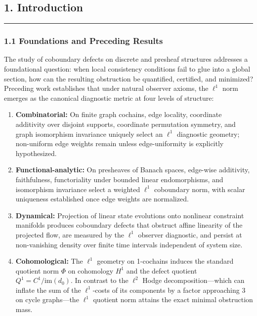 \documentclass[
]{article}
\providecommand{\tightlist}{%
  \setlength{\itemsep}{0pt}\setlength{\parskip}{0pt}}
\providecommand{\tightlist}{%
  \setlength{\itemsep}{0pt}\setlength{\parskip}{0pt}}
\begin{document}
\subsection{1. Introduction}\label{introduction}

\begin{center}\rule{0.5\linewidth}{0.5pt}\end{center}

\subsubsection{1.1 Foundations and Preceding Results}\label{foundations-and-preceding-results}

The study of coboundary defects on discrete and presheaf structures addresses a foundational question: when local consistency conditions fail to glue into a global section, how can the resulting obstruction be quantified, certified, and minimized? Preceding work establishes that under natural observer axioms, the \(\ell^1\) norm emerges as the canonical diagnostic metric at four levels of structure:

\begin{enumerate}
\def\labelenumi{\arabic{enumi}.}
\tightlist
\item
  \textbf{Combinatorial:} On finite graph cochains, edge locality, coordinate additivity over disjoint supports, coordinate permutation symmetry, and graph isomorphism invariance uniquely select an \(\ell^1\) diagnostic geometry; non-uniform edge weights remain unless edge-uniformity is explicitly hypothesized.
\item
  \textbf{Functional-analytic:} On presheaves of Banach spaces, edge-wise additivity, faithfulness, functoriality under bounded linear endomorphisms, and isomorphism invariance select a weighted \(\ell^1\) coboundary norm, with scalar uniqueness established once edge weights are normalized.
\item
  \textbf{Dynamical:} Projection of linear state evolutions onto nonlinear constraint manifolds produces coboundary defects that obstruct affine linearity of the projected flow, are measured by the \(\ell^1\) observer diagnostic, and persist at non-vanishing density over finite time intervals independent of system size.
\item
  \textbf{Cohomological:} The \(\ell^1\) geometry on 1-cochains induces the standard quotient norm \(\Phi\) on cohomology \(H^1\) and the defect quotient \(Q^1 = C^1 / \mathrm{im}(d_0)\). In contrast to the \(\ell^2\) Hodge decomposition---which can inflate the sum of the \(\ell^1\)-costs of its components by a factor approaching 3 on cycle graphs---the \(\ell^1\) quotient norm attains the exact minimal obstruction mass.
\end{enumerate}
\end{document}
